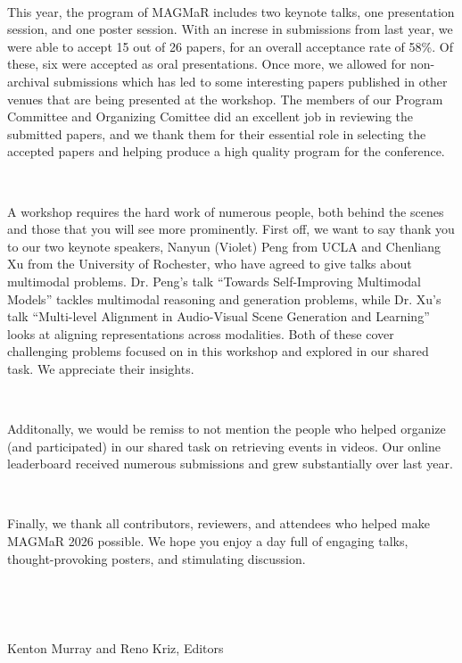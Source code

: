 $ $\par

This year, the program of MAGMaR includes two keynote talks, one presentation session, and one poster session. With an increse in submissions from last year, we were able to accept 15 out of 26 papers, for an overall acceptance rate of 58\%. Of these, six were accepted as oral presentations. Once more, we allowed for non-archival submissions which has led to some interesting papers published in other venues that are being presented at the workshop. The members of our Program Committee and Organizing Comittee did an excellent job in reviewing the submitted papers, and we thank them for their essential role in selecting the accepted papers and helping produce a high quality program for the conference.



$ $\par


A workshop requires the hard work of numerous people, both behind the scenes and those that you will see more prominently. First off, we want to say thank you to our two keynote speakers, Nanyun (Violet) Peng from UCLA and Chenliang Xu from the University of Rochester, who have agreed to give talks about multimodal problems. Dr. Peng's talk ``Towards Self-Improving Multimodal Models'' tackles multimodal reasoning and generation problems, while Dr. Xu's talk ``Multi-level Alignment in Audio-Visual Scene Generation and Learning'' looks at aligning representations across modalities. Both of these cover challenging problems focused on in this workshop and explored in our shared task. We appreciate their insights.


$ $\par

Additonally, we would be remiss to not mention the people who helped organize (and participated) in our shared task on retrieving events in videos. Our online leaderboard received numerous submissions and grew substantially over last year.


$ $\par

Finally, we thank all contributors, reviewers, and attendees who helped make MAGMaR 2026 possible. We hope you enjoy a day full of engaging talks, thought-provoking posters, and stimulating discussion.

$ $\par

$ $\par

Kenton Murray and Reno Kriz, Editors
